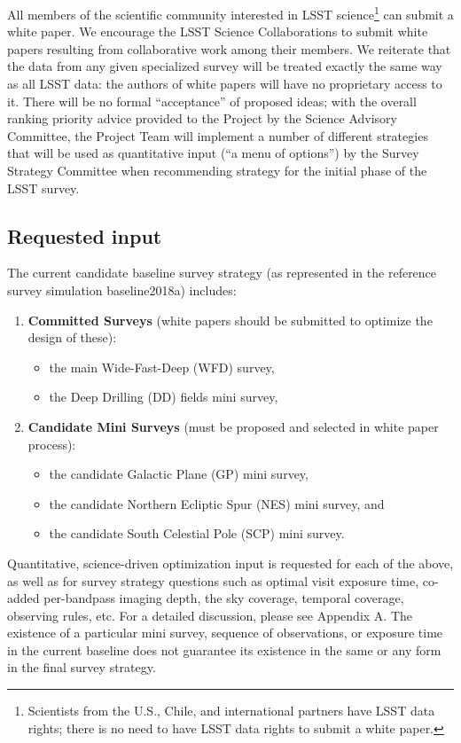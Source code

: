 \documentclass[DM,lsstdraft,toc,usenatbib]{lsstdoc}
\begin{document}
All members of the scientific community interested in LSST science\footnote{Scientists from the U.S., Chile,
and international partners have LSST data rights; there is no need to have LSST data rights to submit 
a white paper.} can submit a white paper.
We encourage the LSST Science Collaborations to submit white papers resulting from collaborative
work among their members.
We reiterate that the data from any given specialized survey will be treated exactly the same 
way as all LSST data: the authors of white papers will have no proprietary access to it. There will be no 
formal ``acceptance'' of proposed ideas; with the overall ranking priority advice provided to the 
Project by the Science Advisory Committee, the Project Team will implement a number of
different strategies that will be used as quantitative input (``a menu of options'') by the 
Survey Strategy Committee when recommending strategy for the initial phase of the LSST survey. 


\subsection{Requested input \label{sec:reqinput}}

The current candidate baseline survey strategy (as represented in the reference survey simulation baseline2018a) 
includes:
\begin{enumerate}
\item {\bf Committed Surveys} (white papers should be submitted to optimize the design of these):
\begin{itemize}
\item the main Wide-Fast-Deep (WFD) survey,
\item the Deep Drilling (DD) fields mini survey,
\end{itemize}
\item {\bf Candidate Mini Surveys} (must be proposed and selected in white paper process):
\begin{itemize}
\item the candidate Galactic Plane (GP) mini survey,
\item the candidate Northern Ecliptic Spur (NES) mini survey, and
\item the candidate South Celestial Pole (SCP) mini survey. 
\end{itemize}
\end{enumerate}

Quantitative, science-driven optimization input is requested for each of the above, as well as 
for survey strategy questions such as optimal visit exposure time,
co-added per-bandpass imaging depth, the sky coverage, temporal coverage, observing
rules, etc.  For a detailed discussion, please see Appendix A. The existence of a particular
mini survey, sequence of observations, or exposure time in the current baseline does not 
guarantee its existence in the same or any form in the final survey strategy. 
\end{document}
